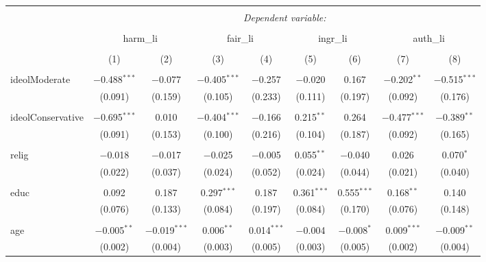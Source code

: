 
\begin{table}[!htbp] \centering 
  \caption{} 
  \label{} 
\begin{tabular}{@{\extracolsep{5pt}}lcccccccc} 
\\[-1.8ex]\hline 
\hline \\[-1.8ex] 
 & \multicolumn{8}{c}{\textit{Dependent variable:}} \\ 
\cline{2-9} 
\\[-1.8ex] & \multicolumn{2}{c}{harm\_li} & \multicolumn{2}{c}{fair\_li} & \multicolumn{2}{c}{ingr\_li} & \multicolumn{2}{c}{auth\_li} \\ 
\\[-1.8ex] & (1) & (2) & (3) & (4) & (5) & (6) & (7) & (8)\\ 
\hline \\[-1.8ex] 
 ideolModerate & $-$0.488$^{***}$ & $-$0.077 & $-$0.405$^{***}$ & $-$0.257 & $-$0.020 & 0.167 & $-$0.202$^{**}$ & $-$0.515$^{***}$ \\ 
  & (0.091) & (0.159) & (0.105) & (0.233) & (0.111) & (0.197) & (0.092) & (0.176) \\ 
  & & & & & & & & \\ 
 ideolConservative & $-$0.695$^{***}$ & 0.010 & $-$0.404$^{***}$ & $-$0.166 & 0.215$^{**}$ & 0.264 & $-$0.477$^{***}$ & $-$0.389$^{**}$ \\ 
  & (0.091) & (0.153) & (0.100) & (0.216) & (0.104) & (0.187) & (0.092) & (0.165) \\ 
  & & & & & & & & \\ 
 relig & $-$0.018 & $-$0.017 & $-$0.025 & $-$0.005 & 0.055$^{**}$ & $-$0.040 & 0.026 & 0.070$^{*}$ \\ 
  & (0.022) & (0.037) & (0.024) & (0.052) & (0.024) & (0.044) & (0.021) & (0.040) \\ 
  & & & & & & & & \\ 
 educ & 0.092 & 0.187 & 0.297$^{***}$ & 0.187 & 0.361$^{***}$ & 0.555$^{***}$ & 0.168$^{**}$ & 0.140 \\ 
  & (0.076) & (0.133) & (0.084) & (0.197) & (0.084) & (0.170) & (0.076) & (0.148) \\ 
  & & & & & & & & \\ 
 age & $-$0.005$^{**}$ & $-$0.019$^{***}$ & 0.006$^{**}$ & 0.014$^{***}$ & $-$0.004 & $-$0.008$^{*}$ & 0.009$^{***}$ & $-$0.009$^{**}$ \\ 
  & (0.002) & (0.004) & (0.003) & (0.005) & (0.003) & (0.005) & (0.002) & (0.004) \\ 

\end{tabular}
\end{table}
